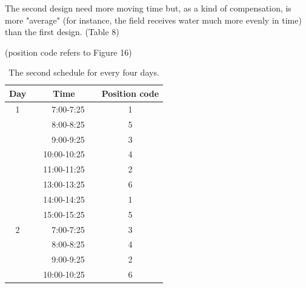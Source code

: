 \documentclass[12pt,a4paper,titlepage]{article}
\begin{document}
The second design need more moving time but, as a kind of
compensation, is more "average" (for instance, the field receives
water much more evenly in time) than the first design. (Table 8)


\begin{table}[!htb]
\centering \caption{The second schedule for every four days.}

(position code refers to Figure 16)


\begin{tabular}{lllll}
\hline
\multicolumn{1}{c}{Day} & \multicolumn{1}{c}{} & \multicolumn{1}{c}{Time} & \multicolumn{1}{c}{} & \multicolumn{1}{c}{Position code} \\
\hline
\multicolumn{1}{c}{1} & \multicolumn{1}{c}{} & \multicolumn{1}{r}{7:00-7:25} & \multicolumn{1}{r}{} & \multicolumn{1}{c}{1} \\
\multicolumn{1}{c}{} & \multicolumn{1}{c}{} & \multicolumn{1}{r}{8:00-8:25} & \multicolumn{1}{r}{} & \multicolumn{1}{c}{5} \\
\multicolumn{1}{c}{} & \multicolumn{1}{c}{} & \multicolumn{1}{r}{9:00-9:25} & \multicolumn{1}{r}{} & \multicolumn{1}{c}{3} \\
\multicolumn{1}{c}{} & \multicolumn{1}{c}{} & \multicolumn{1}{r}{10:00-10:25} & \multicolumn{1}{r}{} & \multicolumn{1}{c}{4} \\
\multicolumn{1}{c}{} & \multicolumn{1}{c}{} & \multicolumn{1}{r}{11:00-11:25} & \multicolumn{1}{r}{} & \multicolumn{1}{c}{2} \\
\multicolumn{1}{c}{} & \multicolumn{1}{c}{} & \multicolumn{1}{r}{13:00-13:25} & \multicolumn{1}{r}{} & \multicolumn{1}{c}{6} \\
\multicolumn{1}{c}{} & \multicolumn{1}{c}{} & \multicolumn{1}{r}{14:00-14:25} & \multicolumn{1}{r}{} & \multicolumn{1}{c}{1} \\
\multicolumn{1}{c}{} & \multicolumn{1}{c}{} & \multicolumn{1}{r}{15:00-15:25} & \multicolumn{1}{r}{} & \multicolumn{1}{c}{5} \\
\multicolumn{1}{c}{2} & \multicolumn{1}{c}{} & \multicolumn{1}{r}{7:00-7:25} & \multicolumn{1}{r}{} & \multicolumn{1}{c}{3} \\
\multicolumn{1}{c}{} & \multicolumn{1}{c}{} & \multicolumn{1}{r}{8:00-8:25} & \multicolumn{1}{r}{} & \multicolumn{1}{c}{4} \\
\multicolumn{1}{c}{} & \multicolumn{1}{c}{} & \multicolumn{1}{r}{9:00-9:25} & \multicolumn{1}{r}{} & \multicolumn{1}{c}{2} \\
\multicolumn{1}{c}{} & \multicolumn{1}{c}{} & \multicolumn{1}{r}{10:00-10:25} & \multicolumn{1}{r}{} & \multicolumn{1}{c}{6} \\

\end{tabular}
\end{table}
\end{document}
